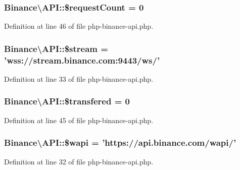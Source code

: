 \hypertarget{classBinance_1_1API_a69a4bfc5a6773dff1d01166dfbb402a2}{
\subsubsection[{\$request\-Count}]{\setlength{\rightskip}{0pt plus 5cm}Binance\textbackslash{}\-A\-P\-I\-::\$request\-Count = 0\hspace{0.3cm}{\ttfamily [protected]}}}\label{classBinance_1_1API_a69a4bfc5a6773dff1d01166dfbb402a2}


Definition at line 46 of file php-\/binance-\/api.\-php.

\hypertarget{classBinance_1_1API_a0ce2df2282110071b78061c3043200af}{
\subsubsection[{\$stream}]{\setlength{\rightskip}{0pt plus 5cm}Binance\textbackslash{}\-A\-P\-I\-::\$stream = 'wss\-://stream.\-binance.\-com\-:9443/ws/'\hspace{0.3cm}{\ttfamily [protected]}}}\label{classBinance_1_1API_a0ce2df2282110071b78061c3043200af}


Definition at line 33 of file php-\/binance-\/api.\-php.

\hypertarget{classBinance_1_1API_ac40776b871ae1591348c96162e872789}{
\subsubsection[{\$transfered}]{\setlength{\rightskip}{0pt plus 5cm}Binance\textbackslash{}\-A\-P\-I\-::\$transfered = 0\hspace{0.3cm}{\ttfamily [protected]}}}\label{classBinance_1_1API_ac40776b871ae1591348c96162e872789}


Definition at line 45 of file php-\/binance-\/api.\-php.

\hypertarget{classBinance_1_1API_a52a5376574ff759fb1df6c8efe24cb7f}{
\subsubsection[{\$wapi}]{\setlength{\rightskip}{0pt plus 5cm}Binance\textbackslash{}\-A\-P\-I\-::\$wapi = 'https\-://api.\-binance.\-com/wapi/'\hspace{0.3cm}{\ttfamily [protected]}}}\label{classBinance_1_1API_a52a5376574ff759fb1df6c8efe24cb7f}


Definition at line 32 of file php-\/binance-\/api.\-php.

